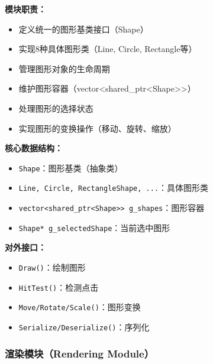 \documentclass[12pt,a4paper]{article}
\begin{document}
\begin{tcolorbox}
\textbf{模块职责：}
\begin{itemize}
    \item 定义统一的图形基类接口（Shape）
    \item 实现8种具体图形类（Line, Circle, Rectangle等）
    \item 管理图形对象的生命周期
    \item 维护图形容器（vector<shared\_ptr<Shape>>）
    \item 处理图形的选择状态
    \item 实现图形的变换操作（移动、旋转、缩放）
\end{itemize}

\textbf{核心数据结构：}
\begin{itemize}
    \item \texttt{Shape}：图形基类（抽象类）
    \item \texttt{Line, Circle, RectangleShape, ...}：具体图形类
    \item \texttt{vector<shared\_ptr<Shape>> g\_shapes}：图形容器
    \item \texttt{Shape* g\_selectedShape}：当前选中图形
\end{itemize}

\textbf{对外接口：}
\begin{itemize}
    \item \texttt{Draw()}：绘制图形
    \item \texttt{HitTest()}：检测点击
    \item \texttt{Move/Rotate/Scale()}：图形变换
    \item \texttt{Serialize/Deserialize()}：序列化
\end{itemize}
\end{tcolorbox}

\subsubsection{渲染模块（Rendering Module）}
\end{document}
